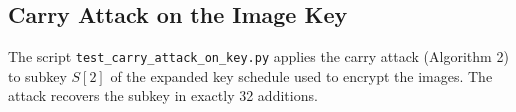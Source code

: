 \documentclass{sbc2023-pdf}%
\theoremstyle{plain}
\begin{document}


\subsection{Carry Attack on the Image Key}
\label{app:carry_attack_code}

The script \texttt{test\_carry\_attack\_on\_key.py} applies the carry attack (Algorithm 2) to subkey $S[2]$ of the expanded key schedule used to encrypt the images. The attack recovers the subkey in exactly 32 additions.





\end{document}
